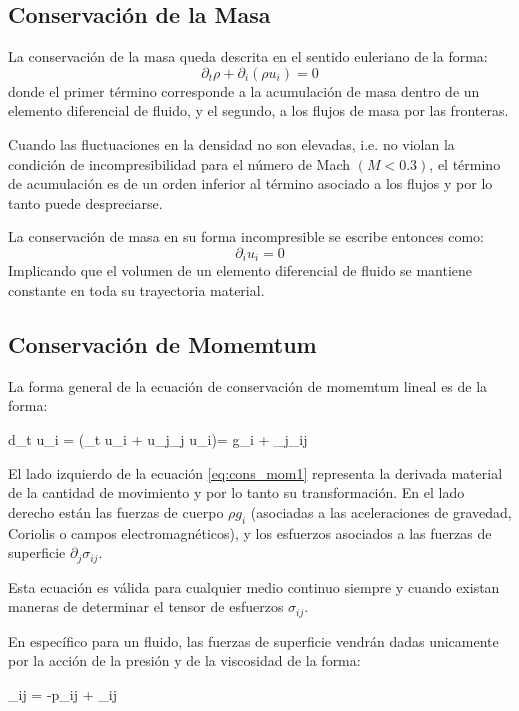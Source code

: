 \subsection{Conservación de la Masa}
La conservación de la masa queda descrita en el sentido euleriano de la forma:
\begin{equation}\label{eq:cons_masa}
\partial_t \rho + \partial_i(\rho u_i) = 0
\end{equation}
donde el primer término corresponde a la acumulación de masa dentro de un elemento diferencial de fluido, y el segundo, a los flujos de masa por las fronteras.

Cuando las fluctuaciones en la densidad no son elevadas, i.e. no violan la condición de incompresibilidad para el número de Mach $(M<0.3)$, el término de acumulación es de un orden inferior al término asociado a los flujos y por lo tanto puede despreciarse.

La conservación de masa en su forma incompresible se escribe entonces como:
\begin{equation}
\partial_i u_i =0
\end{equation}
Implicando que el volumen de un elemento diferencial de fluido se mantiene constante en toda su trayectoria material.
\subsection{Conservación de Momemtum}
La forma general de la ecuación de conservación de momemtum lineal es de la forma:

\be\label{eq:cons_mom1}
\rho d_t u_i = \rho(\partial_t u_i + u_j\partial_j u_i)= \rho g_i + \partial_j\sigma_{ij}
\ee

El lado izquierdo de la ecuación \ref{eq:cons_mom1} representa la derivada material de la cantidad de movimiento y por lo tanto su transformación. En el lado derecho están las fuerzas de cuerpo $\rho g_i$ (asociadas a las aceleraciones de gravedad, Coriolis o campos electromagnéticos), y los esfuerzos asociados a las fuerzas de superficie $\partial_j \sigma_{ij}$. 

Esta ecuación es válida para cualquier medio continuo siempre y cuando existan maneras de determinar el tensor de esfuerzos $\sigma_{ij}$.

En específico para un fluido, las fuerzas de superficie vendrán dadas unicamente por la acción de la presión y de la viscosidad de la forma:

\be
\sigma_{ij} = -p\delta_{ij} + \tau_{ij}
\ee 

